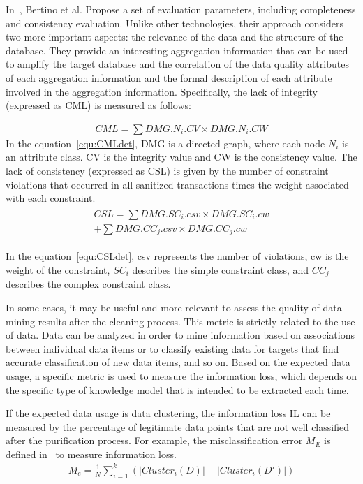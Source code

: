 \documentclass[journal,transmag]{IEEEtran}
\begin{document}
In~\cite{bertino2005information}, Bertino et al. Propose a set of evaluation parameters, including completeness and consistency evaluation. Unlike other technologies, their approach considers two more important aspects: the relevance of the data and the structure of the database. They provide an interesting aggregation information that can be used to amplify the target database and the correlation of the data quality attributes of each aggregation information and the formal description of each attribute involved in the aggregation information. Specifically, the lack of integrity (expressed as CML) is measured as follows:


\begin{eqnarray}\label{equ:CMLdet}
CML = \sum{DMG.N_i.CV \times DMG.N_i.CW}
\end{eqnarray}
In the equation~\ref{equ:CMLdet}, DMG is a directed graph, where each node $ {N_i} $ is an attribute class. CV is the integrity value and CW is the consistency value. The lack of consistency (expressed as CSL) is given by the number of constraint violations that occurred in all sanitized transactions times the weight associated with each constraint.
\begin{eqnarray}\label{equ:CSLdet}
\begin{aligned}
CSL = \sum{DMG.SC_i.csv \times DMG.SC_i.cw} \\
+ \sum{DMG.CC_j.csv \times DMG.CC_j.cw}
\end{aligned}
\end{eqnarray}

In the equation~\ref{equ:CSLdet}, csv represents the number of violations, cw is the weight of the constraint, $ SC_i $ describes the simple constraint class, and $ CC_j $ describes the complex constraint class.

In some cases, it may be useful and more relevant to assess the quality of data mining results after the cleaning process. This metric is strictly related to the use of data. Data can be analyzed in order to mine information based on associations between individual data items or to classify existing data for targets that find accurate classification of new data items, and so on. Based on the expected data usage, a specific metric is used to measure the information loss, which depends on the specific type of knowledge model that is intended to be extracted each time.

If the expected data usage is data clustering, the information loss IL can be measured by the percentage of legitimate data points that are not well classified after the purification process. For example, the misclassification error $ M_E $ is defined in~\cite{oliveira2010privacy} to measure information loss.
\begin{eqnarray}\label{equ:Medet}
M_e = \frac{1}{N} \sum^{k}_{i=1} (|Cluster_i(D)|-|Cluster_i(D')|) 
\end{eqnarray}
\end{document}
